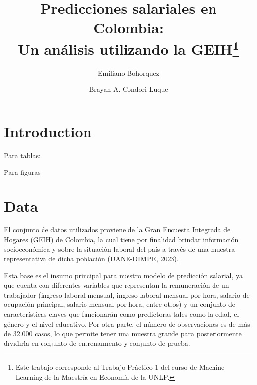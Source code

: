 \documentclass[11pt,oneside]{article}
\begin{document}
	
	
	\title{Predicciones salariales en Colombia: \\
		Un análisis utilizando la GEIH\thanks{Este trabajo corresponde al Trabajo Práctico 1 del curso de Machine Learning de la Maestría en Economía de la UNLP.}}
	
	\author{
		Emiliano Bohorquez \and 
		Brayan A. Condori Luque}
	
	\maketitle
	
	\newpage
	\section{Introduction}
	
	Para tablas:
	
	
	Para figuras
	
	\section{Data}
	
	El conjunto de datos utilizados proviene de la Gran Encuesta Integrada de Hogares (GEIH) de Colombia, la cual tiene por finalidad brindar información socioeconómica y sobre la situación laboral del país a través de una muestra representativa de dicha población (DANE-DIMPE, 2023). 
	
	Esta base es el insumo principal para nuestro modelo de predicción salarial, ya que cuenta con diferentes variables que representan la remuneración de un trabajador (ingreso laboral mensual, ingreso laboral mensual por hora, salario de ocupación principal, salario mensual por hora, entre otros) y un conjunto de características claves que funcionarán como predictoras tales como la edad, el género y el nivel educativo. Por otra parte, el número de observaciones es de más de 32.000 casos, lo que permite tener una muestra grande para posteriormente dividirla en conjunto de entrenamiento y conjunto de prueba. 
	
\end{document}
